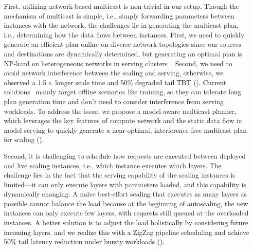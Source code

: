 First,
utilizing network-based multicast is non-trivial in our setup.
Though the mechanism of multicast is simple, i.e.,
simply forwarding parameters between instances with the network,
the challenges lie in generating the multicast plan,
i.e., determining how the data flows between instances.
First, we need to quickly generate an efficient plan online on
diverse network topologies since our sources and destinations are dynamically determined,
but generating an optimal plan is NP-hard on
heterogeneous networks in serving clusters~\cite{DBLP:journals/jpdc/BhatRP03}.
Second, we need to avoid network interference between the scaling and serving,
otherwise, we observed a 1.5\,$\times$ longer scale time and 50\% degraded tail TBT (\textsection{\ref{sec:overview}}).
Current solutions~\cite{DBLP:conf/asplos/CowanMMSX23,DBLP:conf/ppopp/CaiLMMMNS21,DBLP:conf/sc/GhazimirsaeedZR20} mainly
target offline scenarios like training,
so they can tolerate long plan generation time and
don't need to consider interference from serving workloads.
To address the issue, we propose a
model-aware multicast planner,
which leverages the key features of compute network and the
static data flow in model serving to quickly generate a near-optimal,
interference-free multicast plan for scaling (\textsection{\ref{sec:design-plan}}).

Second, it is challenging to schedule how requests are executed
between deployed and live scaling instances,
i.e., which instance executes which layers.
The challenge lies in the fact that the serving capability of the scaling instances
is limited---it can only execute layers with parameters loaded,
and this capability is dynamically changing.
A naive best-effort scaling that executes as many layers as possible
cannot balance the load because at the beginning of autoscaling,
the new instances can only execute few layers, 
with requests still queued at the overloaded instances.
A better solution is to adjust the load holistically by considering future incoming layers,
and we realize this with a ZigZag pipeline scheduling
and achieve 50\% tail latency reduction under bursty workloads
(\textsection{\ref{sec:design-pp}}).



